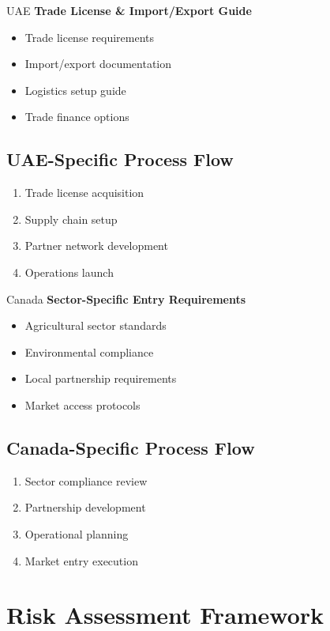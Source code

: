 \begin{regionalbox}{UAE}
\textbf{Trade License \& Import/Export Guide}
\begin{itemize}
    \item Trade license requirements
    \item Import/export documentation
    \item Logistics setup guide
    \item Trade finance options
\end{itemize}

\subsection{UAE-Specific Process Flow}
\begin{enumerate}
    \item Trade license acquisition
    \item Supply chain setup
    \item Partner network development
    \item Operations launch
\end{enumerate}
\end{regionalbox}

\begin{regionalbox}{Canada}
\textbf{Sector-Specific Entry Requirements}
\begin{itemize}
    \item Agricultural sector standards
    \item Environmental compliance
    \item Local partnership requirements
    \item Market access protocols
\end{itemize}

\subsection{Canada-Specific Process Flow}
\begin{enumerate}
    \item Sector compliance review
    \item Partnership development
    \item Operational planning
    \item Market entry execution
\end{enumerate}
\end{regionalbox}

\section{Risk Assessment Framework}


